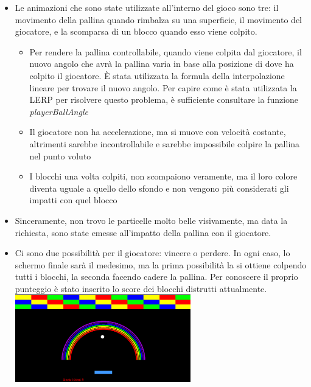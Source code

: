 \begin{itemize}
    \item Le animazioni che sono state utilizzate all'interno del gioco sono tre: il movimento della pallina quando rimbalza su una superficie, il movimento del giocatore, e la scomparsa di un blocco quando esso viene colpito.\\
    \begin{itemize}
        \item Per rendere la pallina controllabile, quando viene colpita dal giocatore, il nuovo angolo che avrà la pallina varia in base alla posizione di dove ha colpito il giocatore. È stata utilizzata la formula della interpolazione lineare per trovare il nuovo angolo. Per capire come è stata utilizzata la LERP per risolvere questo problema, è sufficiente consultare la funzione \textit{playerBallAngle}
        \item Il giocatore non ha accelerazione, ma si muove con velocità costante, altrimenti sarebbe incontrollabile e sarebbe impossibile colpire la pallina nel punto voluto
        \item I blocchi una volta colpiti, non scompaiono veramente, ma il loro colore diventa uguale a quello dello sfondo e non vengono più considerati gli impatti con quel blocco
    \end{itemize}
    \item Sinceramente, non trovo le particelle molto belle visivamente, ma data la richiesta, sono state emesse all'impatto della pallina con il giocatore.
    \item Ci sono due possibilità per il giocatore: vincere o perdere. In ogni caso, lo schermo finale sarà il medesimo, ma la prima possibilità la si ottiene colpendo tutti i blocchi, la seconda facendo cadere la pallina. Per conoscere il proprio punteggio è stato inserito lo score dei blocchi distrutti attualmente.\\
           {\centering
\includegraphics[width=0.6\textwidth]{arkanoin.png}} 
\end{itemize}